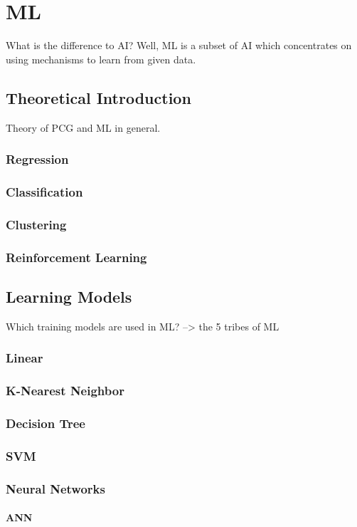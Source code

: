 \documentclass[MGS,Master,english]{twbook}%
\begin{document}
\chapter{\acl{ML}}
What is the difference to AI? Well, ML is a subset of AI which concentrates on using mechanisms to learn from given data.
\section{Theoretical Introduction}
Theory of PCG and ML in general.

\subsection{Regression}
\subsection{Classification}
\subsection{Clustering}
\subsection{Reinforcement Learning}

\section{Learning Models}
Which training models are used in ML? --> the 5 tribes of ML
\subsection{Linear}
\subsection{K-Nearest Neighbor}
\subsection{Decision Tree}
\subsection{\acl{SVM}}
\subsection{Neural Networks}
\subsubsection{\acl{ANN}}
\end{document}

